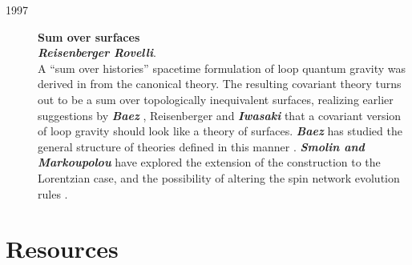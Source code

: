 \begin{description}
	\item[1997] {\bf Sum over surfaces\\
	{\em Reisenberger Rovelli}}.\\  
	A ``sum over histories'' spacetime formulation of loop 
	quantum gravity was derived in 
	\cite{RovelliSurf,ReisenbergerRovelli} from the canonical 
	theory.  The resulting covariant theory turns out to be a sum 
	over topologically inequivalent surfaces, realizing earlier 
	suggestions by \textbf{\em Baez\/} 
	\cite{Baez,Baez2,Baez95a,Baez4}, Reisenberger  
	\cite{Reisenberger,Reisenberger94} and \textbf{\em Iwasaki\/} 
	\cite{Iwasaki} that a covariant version of loop gravity 
	should look like a theory of surfaces.  \textbf{\em Baez} has 
	studied the general structure of theories defined in this 
	manner \cite{Baez97}.  \textbf{\em Smolin and Markoupolou} 
	have explored the extension of the construction to the 
	Lorentzian case, and the possibility of altering the spin 
	network evolution rules \cite{SmolinMarkopoulo}.


\end{description}

\section{Resources}\label{3.5}

